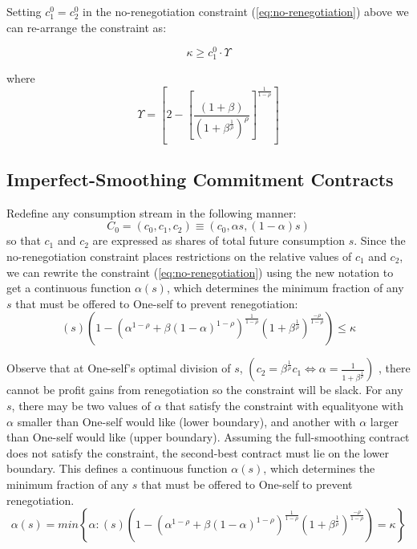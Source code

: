 \documentclass[11pt,english]{article}
\theoremstyle{plain}
\theoremstyle{definition}
\begin{document}
Setting $c_{1}^{0}=c_{2}^{0}$ in the no-renegotiation constraint
(\ref{eq:no-renegotiation}) above we can re-arrange the constraint
as: 

\begin{equation}
\kappa\geq c_{1}^{0}\cdotp\Upsilon\label{eq:smoothing-no-renegotiation}
\end{equation}

where 
\begin{equation}
\Upsilon=\left[2-\left[\frac{(1+\beta)}{\left(1+\beta^{\frac{1}{\rho}}\right)^{\rho}}\right]^{\frac{1}{1-\rho}}\right]\label{eq:upsilon}
\end{equation}


\subsection{Imperfect-Smoothing Commitment Contracts}

Redefine any consumption stream in the following manner: 
\begin{equation}
C_{0}=\left(c_{0},c_{1},c_{2}\right)\equiv\left(c_{0},\alpha s,\left(1-\alpha\right)s\right)\label{eq:new-notation}
\end{equation}
so that $c_{1}$ and $c_{2}$ are expressed as shares of total future
consumption $s$. Since the no-renegotiation constraint places restrictions
on the relative values of $c_{1}$ and $c_{2}$, we can rewrite the
constraint (\ref{eq:no-renegotiation}) using the new notation to get
a continuous function $\alpha\left(s\right)$, which determines the
minimum fraction of any $s$ that must be offered to One-self to prevent
renegotiation: 
\begin{equation}
\left(s\right)\left(1-\left(\alpha^{1-\rho}+\beta\left(1-\alpha\right)^{1-\rho}\right)^{\frac{1}{1-\rho}}\left(1+\beta^{\frac{1}{\rho}}\right)^{\frac{-\rho}{1-\rho}}\right)\leq\kappa\label{eq:no-renegotiation-alpha-s}
\end{equation}

Observe that at One-self's optimal division of $s$, $\left(c_{2}=\beta^{\frac{1}{\rho}}c_{1}\Longleftrightarrow\alpha=\frac{1}{1+\beta^{\frac{1}{\rho}}}\right)$
, there cannot be profit gains from renegotiation so the constraint
will be slack. For any $s$, there may be two values of $\alpha$
that satisfy the constraint with equality\textendash one with $\alpha$
smaller than One-self would like (lower boundary), and another with
$\alpha$ larger than One-self would like (upper boundary). Assuming
the full-smoothing contract does not satisfy the constraint, the second-best
contract must lie on the lower boundary. This defines a continuous
function $\alpha\left(s\right)$, which determines the minimum fraction
of any $s$ that must be offered to One-self to prevent renegotiation.
\begin{equation}
\alpha\left(s\right)=min\left\{ \alpha:\left(s\right)\left(1-\left(\alpha^{1-\rho}+\beta\left(1-\alpha\right)^{1-\rho}\right)^{\frac{1}{1-\rho}}\left(1+\beta^{\frac{1}{\rho}}\right)^{\frac{-\rho}{1-\rho}}\right)=\kappa\right\} \label{eq:alpha-1}
\end{equation}
\end{document}
